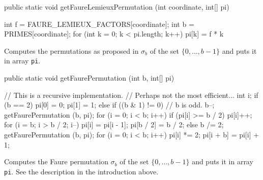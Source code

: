 \begin{htmlonly}
\end{htmlonly}
\begin{code}

   public static void getFaureLemieuxPermutation (int coordinate, int[] pi) \begin{hide} {
      int f = FAURE_LEMIEUX_FACTORS[coordinate];
      int b = PRIMES[coordinate];
      for (int k = 0; k < pi.length; k++)
         pi[k] = f * k %
   }\end{hide}
\end{code}
 \begin{tabb}
   Computes the permutations as proposed in \cite{vFAU09a} $\sigma_b$ of the set
   $\{0, \ldots, b - 1\}$ and puts it in array \texttt{pi}.
 \end{tabb}
\begin{htmlonly}
\end{htmlonly}
\begin{code}  

   public static void getFaurePermutation (int b, int[] pi) \begin{hide} {
      // This is a recursive implementation.  
      // Perhaps not the most efficient...
      int i;
      if (b == 2) {
         pi[0] = 0;
         pi[1] = 1;
      }
      else if ((b & 1) != 0) {
         // b is odd.
         b--;
         getFaurePermutation (b, pi);
         for (i = 0; i < b; i++)
            if (pi[i] >= b / 2)
               pi[i]++;
         for (i = b; i > b / 2; i--)
            pi[i] = pi[i - 1];
         pi[b / 2] = b / 2;
      }
      else {
         b /= 2;
         getFaurePermutation (b, pi);
         for (i = 0; i < b; i++) {
            pi[i] *= 2;
            pi[i + b] = pi[i] + 1;
         }
      }
   }\end{hide}  
\end{code}
 \begin{tabb}
   Computes the Faure permutation \cite{rFAU92a} $\sigma_b$ of the set
   $\{0, \ldots, b - 1\}$ and puts it in array \texttt{pi}.
   See the description in the introduction above.
 \end{tabb}
\begin{htmlonly}
\end{htmlonly}
